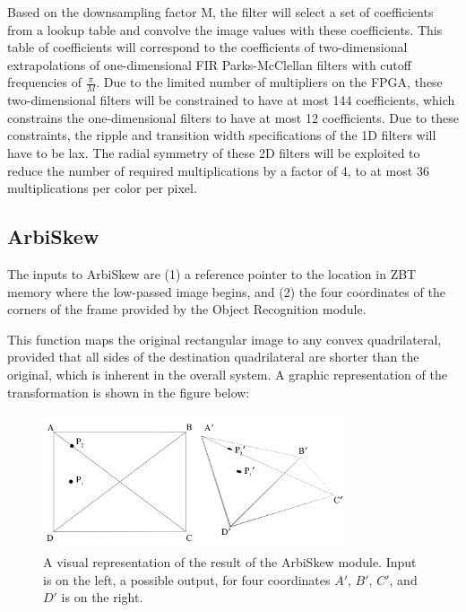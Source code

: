 \documentclass[11pt]{article}
\begin{document}
Based on the downsampling factor M, the filter will select a set of coefficients from a lookup table and convolve the image values with these coefficients. This table of coefficients will correspond to the coefficients of two-dimensional extrapolations of one-dimensional FIR Parks-McClellan filters with cutoff frequencies of \( \frac{\pi}{M} \). Due to the limited number of multipliers on the FPGA, these two-dimensional filters will be constrained to have at most 144 coefficients, which constrains the one-dimensional filters to have at most 12 coefficients. Due to these constraints, the ripple and transition width specifications of the 1D filters will have to be lax. The radial symmetry of these 2D filters will be exploited to reduce the number of required multiplications by a factor of 4, to at most 36 multiplications per color per pixel.

\subsection{ArbiSkew}
The inputs to ArbiSkew are (1) a reference pointer to the location in ZBT memory where the low-passed image begins, and (2) the four coordinates of the corners of the frame provided by the Object Recognition module.

This function maps the original rectangular image to any convex quadrilateral, provided that all sides of the destination quadrilateral are shorter than the original, which is inherent in the overall system. A graphic representation of the transformation is shown in the figure below:

\begin{figure}[h!]
\centering
\includegraphics[width=0.8\textwidth]{arbiskew_graphic.png}
\caption{A visual representation of the result of the ArbiSkew module. Input is on the left, a possible output, for four coordinates $A\prime$, $B\prime$, $C\prime$, and $D\prime$ is on the right.}
\end{figure}
\end{document}
